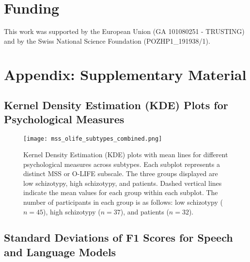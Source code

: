 \documentclass[9pt,a4paper]{rho-class/rho}
\begin{document}
\section*{Funding} This work was supported by the European Union (GA 101080251 - TRUSTING) and by the Swiss National Science Foundation (POZHP1\_191938/1).

\printbibliography 
\newpage  %
\appendix

\onecolumn
\section{Appendix: Supplementary Material}

\subsection{Kernel Density Estimation (KDE) Plots for Psychological Measures}



\begin{figure*}[ht!]
    \centering
    \texttt{[image: mss\_olife\_subtypes\_combined.png]}
    \caption{Kernel Density Estimation (KDE) plots with mean lines for different psychological measures across subtypes. Each subplot represents a distinct MSS or O-LIFE subscale. The three groups displayed are low schizotypy, high schizotypy, and patients. Dashed vertical lines indicate the mean values for each group within each subplot. The number of participants in each group is as follows: low schizotypy ($n = 45$), high schizotypy ($n = 37$), and patients ($n = 32$).}
    \label{fig:mss_olife_subtypes}
\end{figure*}

\newpage  %

\subsection{Standard Deviations of F1 Scores for Speech and Language Models}
\end{document}
